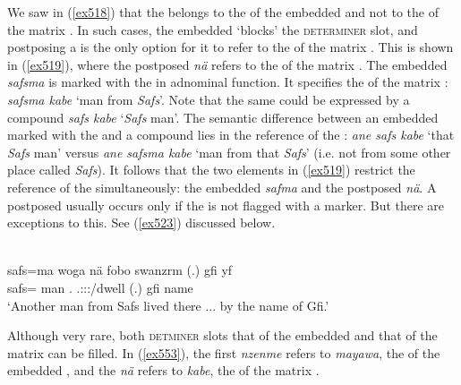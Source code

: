 We saw in (\ref{ex518}) that the  belongs to the  of the embedded  and not to the  of the matrix . In such cases, the embedded  `blocks' the \textsc{determiner} slot, and postposing a  is the only option for it to refer to the  of the matrix . This is shown in (\ref{ex519}), where the postposed  \emph{nä} refers to the  of the matrix . The embedded  \emph{safsma} is marked with the   in adnominal function. It specifies the  of the matrix : \emph{safsma kabe} `man from \emph{Safs}'. Note that the same could be expressed by a  compound \emph{safs kabe} `\emph{Safs} man'. The semantic difference between an embedded  marked with the   and a  compound lies in the reference of the : \emph{ane safs kabe} `that \emph{Safs} man' versus \emph{ane safsma kabe} `man from that \emph{Safs}' (i.e. not from some other place called \emph{Safs}). It follows that the two elements in (\ref{ex519}) restrict the reference of the  simultaneously: the embedded  \emph{safma} and the postposed  \emph{nä}. A postposed  usually occurs only if the  is not flagged with a  marker. But there are exceptions to this. See (\ref{ex523}) discussed below.

\begin{exe}
	\\
	\gll safs=ma woga nä fobo swanzrm (.) gfi yf\\
	safs={\Char} man {\Indf} \Dist.{\All} \Tsg.\Masc:\Sbj:\Nonpast:\Ipfv/dwell (.) gfi name\\
	\trans `Another man from Safs lived there ... by the name of Gfi.'
	\label{ex519}
\end{exe}

Although very rare, both \textsc{detminer} slots \textendash{} that of the embedded  and that of the matrix  \textendash{} can be filled. In (\ref{ex553}), the first   \emph{nzenme} refers to \emph{mayawa}, the  of the embedded , and the   \emph{nä} refers to \emph{kabe}, the  of the matrix .


